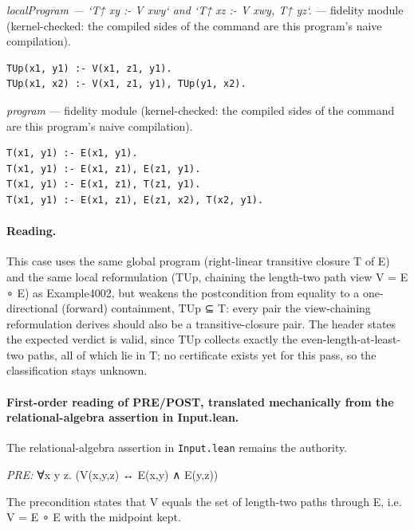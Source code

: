 \documentclass[10pt]{article}
\begin{document}
{\raggedright\textit{localProgram --- `T↑ xy :- V xwy` and `T↑ xz :- V xwy, T↑ yz`.} --- fidelity module (kernel-checked: the compiled sides of the command are this program's naive compilation).\par}

\begin{Verbatim}[fontsize=\scriptsize,breaklines=true,breakanywhere=true,frame=single,framesep=1.5mm]
TUp(x1, y1) :- V(x1, z1, y1).
TUp(x1, x2) :- V(x1, z1, y1), TUp(y1, x2).
\end{Verbatim}

{\raggedright\textit{program} --- fidelity module (kernel-checked: the compiled sides of the command are this program's naive compilation).\par}

\begin{Verbatim}[fontsize=\scriptsize,breaklines=true,breakanywhere=true,frame=single,framesep=1.5mm]
T(x1, y1) :- E(x1, y1).
T(x1, y1) :- E(x1, z1), E(z1, y1).
T(x1, y1) :- E(x1, z1), T(z1, y1).
T(x1, y1) :- E(x1, z1), E(z1, x2), T(x2, y1).
\end{Verbatim}

\paragraph{Reading.} This case uses the same global program (right-linear transitive closure T of E) and the same local reformulation (TUp, chaining the length-two path view V = E ∘ E) as Example4002, but weakens the postcondition from equality to a one-directional (forward) containment, TUp ⊆ T: every pair the view-chaining reformulation derives should also be a transitive-closure pair. The header states the expected verdict is valid, since TUp collects exactly the even-length-at-least-two paths, all of which lie in T; no certificate exists yet for this pass, so the classification stays unknown.

\paragraph{First-order reading of PRE/POST, translated mechanically from the relational-algebra assertion in Input.lean.} The relational-algebra assertion in \texttt{Input.lean} remains the authority.

\textit{PRE:} ∀x y z. (V(x,y,z) ↔ E(x,y) ∧ E(y,z))\par The precondition states that V equals the set of length-two paths through E, i.e. V = E ∘ E with the midpoint kept.
\end{document}
